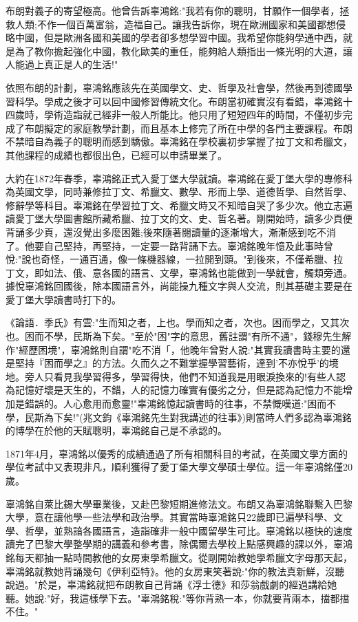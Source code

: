 布朗對義子的寄望極高。他曾告訴辜鴻銘:"我若有你的聰明，甘願作一個學者，拯救人類;不作一個百萬富翁，造福自己。讓我告訴你，現在歐洲國家和美國都想侵略中國，但是歐洲各國和美國的學者卻多想學習中國。我希望你能夠學通中西，就是為了教你擔起強化中國，教化歐美的重任，能夠給人類指出一條光明的大道，讓人能過上真正是人的生活!"

依照布朗的計劃，辜鴻銘應該先在英國學文、史、哲學及社會學，然後再到德國學習科學。學成之後才可以回中國修習傳統文化。布朗當初確實沒有看錯，辜鴻銘十四歲時，學術造詣就己經非一般人所能比。他只用了短短四年的時間，不僅初步完成了布朗擬定的家庭教學計劃，而且基本上修完了所在中學的各門主要課程。布朗不禁暗自為義子的聰明而感到驕傲。辜鴻銘在學校裏初步掌握了拉丁文和希臘文，其他課程的成績也都很出色，已經可以申請畢業了。

大約在1872年春季，辜鴻銘正式入愛丁堡大學就讀。辜鴻銘在愛丁堡大學的專修科為英國文學，同時兼修拉丁文、希臘文、數學、形而上學、道德哲學、自然哲學、修辭學等科目。辜鴻銘在學習拉丁文、希臘文時又不知暗自哭了多少次。他立志遍讀愛丁堡大學圖書館所藏希臘、拉丁文的文、史、哲名著。剛開始時，讀多少頁便背誦多少頁，還沒覺出多麼困難;後來隨著閱讀量的逐漸增大，漸漸感到吃不消了。他要自己堅持，再堅持，一定要一路背誦下去。辜鴻銘晚年憶及此事時曾悅:"說也奇怪，一通百通，像一條機器線，一拉開到頭。"到後來，不僅希臘、拉丁文，即如法、俄、意各國的語言、文學，辜鴻銘也能做到一學就會，觸類旁通。據悅辜鴻銘回國後，除本國語言外，尚能操九種文字與人交流，則其基礎主要是在愛丁堡大學讀書時打下的。

《論語．季氏》有雲:"生而知之者，上也。學而知之者，次也。困而學之，又其次也。困而不學，民斯為下矣。"至於"困"字的意思，舊註謂"有所不通"，錢穆先生解作"經歷困境"，辜鴻銘則自謂"吃不消「，他晚年曾對人說:"其實我讀書時主要的還是堅持『困而學之』的方法。久而久之不難掌握學習藝術，達到'不亦悅乎'的境地。旁人只看見我學習得多，學習得快，他們不知道我是用眼淚換來的!有些人認為記憶好壞是天生的，不錯，人的記憶力確實有優劣之分，但是認為記憶力不能增加是錯誤的。人心愈用而愈靈!"辜鴻銘憶起讀書時的往事，不禁慨嘆道:"困而不學，民斯為下矣!"(兆文鈞《辜鴻銘先生對我講述的往事》)則當時人們多認為辜鴻銘的博學在於他的天賦聰明，辜鴻銘自己是不承認的。

1871年4月，辜鴻銘以優秀的成績通過了所有相關科目的考試，在英國文學方面的學位考試中又表現非凡，順利獲得了愛丁堡大學文學碩士學位。這一年辜鴻銘僅20歲。

辜鴻銘自萊比錫大學畢業後，又赴巴黎短期進修法文。布朗又為辜鴻銘聯繫入巴黎大學，意在讓他學一些法學和政治學。其實當時辜鴻銘只22歲即已遍學科學、文學、哲學，並熟諳各國語言，造詣確非一般中國留學生可比。辜鴻銘以極快的速度讀完了巴黎大學整學期的講義和參考書，除偶爾去學校上點感興趣的課以外，辜鴻銘每天都抽一點時間教他的女房東學希臘文。從剛開始教她學希臘文字母那天起，辜鴻銘就教她背誦幾句《伊利亞特》。他的女房東笑著說:"你的教法真新鮮，沒聽說過。"於是，辜鴻銘就把布朗教自己背誦《浮士德》和莎翁戲劇的經過講給她聽。她說:"好，我這樣學下去。"辜鴻銘稅:"等你背熟一本，你就要背兩本，擋都擋不住。"

